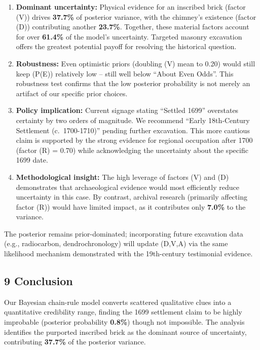 \documentclass[
  11pt,
]{article}
\begin{document}
\begin{enumerate}
\def\labelenumi{\arabic{enumi}.}
\item
  \textbf{Dominant uncertainty:} Physical evidence for an inscribed
  brick (factor (V)) drives \textbf{37.7\%} of posterior variance, with
  the chimney's existence (factor (D)) contributing another
  \textbf{23.7\%}. Together, these material factors account for over
  \textbf{61.4\%} of the model's uncertainty. Targeted masonry
  excavation offers the greatest potential payoff for resolving the
  historical question.
\item
  \textbf{Robustness:} Even optimistic priors (doubling (V) mean to
  0.20) would still keep (P(E)) relatively low -- still well below
  ``About Even Odds''. This robustness test confirms that the low
  posterior probability is not merely an artifact of our specific prior
  choices.
\item
  \textbf{Policy implication:} Current signage stating ``Settled 1699''
  overstates certainty by two orders of magnitude. We recommend ``Early
  18th‑Century Settlement (c.~1700-1710)'' pending further excavation.
  This more cautious claim is supported by the strong evidence for
  regional occupation after 1700 (factor (R) = 0.70) while acknowledging
  the uncertainty about the specific 1699 date.
\item
  \textbf{Methodological insight:} The high leverage of factors (V) and
  (D) demonstrates that archaeological evidence would most efficiently
  reduce uncertainty in this case. By contrast, archival research
  (primarily affecting factor (R)) would have limited impact, as it
  contributes only \textbf{7.0\%} to the variance.
\end{enumerate}

The posterior remains prior-dominated; incorporating future excavation
data (e.g., radiocarbon, dendrochronology) will update (D,V,A) via the
same likelihood mechanism demonstrated with the 19th-century testimonial
evidence.

\subsection{9 Conclusion}\label{conclusion}

Our Bayesian chain-rule model converts scattered qualitative clues into
a quantitative credibility range, finding the 1699 settlement claim to
be highly improbable (posterior probability \textbf{0.8\%}) though not
impossible. The analysis identifies the purported inscribed brick as the
dominant source of uncertainty, contributing \textbf{37.7\%} of the
posterior variance.
\end{document}
